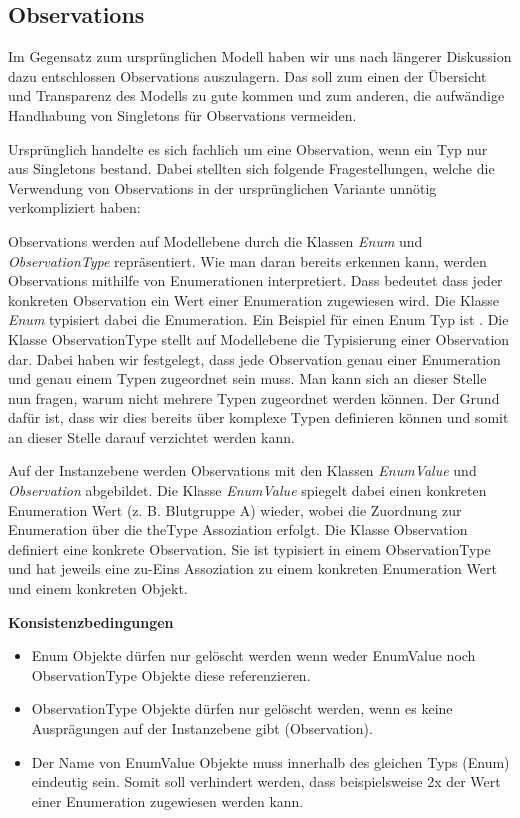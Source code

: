 \subsection{Observations}\label{Observations}
Im Gegensatz zum ursprünglichen Modell haben wir uns nach längerer Diskussion dazu entschlossen Observations auszulagern. 
Das soll zum einen der Übersicht und Transparenz des Modells zu gute kommen und zum anderen, 
die aufwändige Handhabung von Singletons für Observations vermeiden.
 
Ursprünglich handelte es sich fachlich um eine Observation, wenn ein Typ nur aus Singletons bestand. 
Dabei stellten sich folgende Fragestellungen, welche die Verwendung von Observations in der ursprünglichen Variante unnötig verkompliziert haben:


Observations werden auf Modellebene durch die Klassen \emph{Enum} und \emph{ObservationType} repräsentiert. 
Wie man daran bereits erkennen kann, werden Observations mithilfe von Enumerationen interpretiert. 
Dass bedeutet dass jeder konkreten Observation ein Wert einer Enumeration zugewiesen wird. 
Die Klasse \emph{Enum} typisiert dabei die Enumeration. 
Ein Beispiel für einen Enum Typ ist . Die Klasse ObservationType stellt auf Modellebene die 
Typisierung einer Observation dar. Dabei haben wir festgelegt, dass jede Observation genau einer Enumeration 
und genau einem Typen zugeordnet sein muss. Man kann sich an dieser Stelle nun fragen, warum nicht mehrere Typen 
zugeordnet werden können. Der Grund dafür ist, dass wir dies bereits über komplexe Typen definieren können und somit 
an dieser Stelle darauf verzichtet werden kann.

Auf der Instanzebene werden Observations mit den Klassen \emph{EnumValue} und \emph{Observation} abgebildet. 
Die Klasse \emph{EnumValue} spiegelt dabei einen konkreten Enumeration Wert (z. B. Blutgruppe A) wieder, 
wobei die Zuordnung zur Enumeration über die theType Assoziation erfolgt. 
Die Klasse Observation definiert eine konkrete Observation. 
Sie ist typisiert in einem ObservationType und hat jeweils eine zu-Eins Assoziation zu einem konkreten Enumeration Wert 
und einem konkreten Objekt.

\textbf{Konsistenzbedingungen}
\begin{itemize}
  \item Enum Objekte dürfen nur gelöscht werden wenn weder EnumValue noch ObservationType Objekte diese referenzieren.
  \item ObservationType Objekte dürfen nur gelöscht werden, wenn es keine Ausprägungen auf der Instanzebene gibt (Observation).
  \item Der Name von EnumValue Objekte muss innerhalb des gleichen Typs (Enum) eindeutig sein. Somit soll verhindert werden, dass beispielsweise 2x der Wert  einer Enumeration  zugewiesen werden kann.
\end{itemize}

